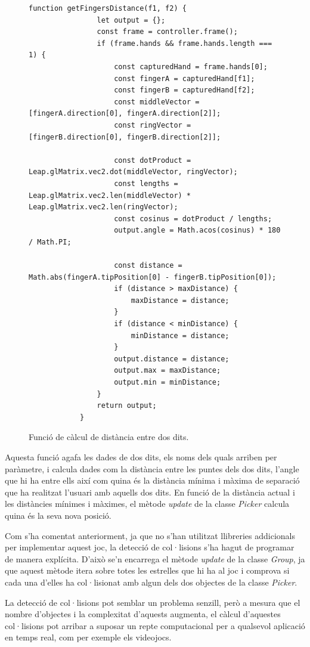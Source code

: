 \documentclass[12pt,a4paper,catalan]{article}
\begin{document}
	\begin{figure}[H]
		\begin{lstlisting}[gobble=12, tabsize=4]
			function getFingersDistance(f1, f2) {
				let output = {};
				const frame = controller.frame();
				if (frame.hands && frame.hands.length === 1) {
					const capturedHand = frame.hands[0];
					const fingerA = capturedHand[f1];
					const fingerB = capturedHand[f2];
					const middleVector = [fingerA.direction[0], fingerA.direction[2]];
					const ringVector = [fingerB.direction[0], fingerB.direction[2]];
					
					const dotProduct = Leap.glMatrix.vec2.dot(middleVector, ringVector);
					const lengths = Leap.glMatrix.vec2.len(middleVector) * Leap.glMatrix.vec2.len(ringVector);
					const cosinus = dotProduct / lengths;
					output.angle = Math.acos(cosinus) * 180 / Math.PI;
					
					const distance = Math.abs(fingerA.tipPosition[0] - fingerB.tipPosition[0]);
					if (distance > maxDistance) {
						maxDistance = distance;
					}
					if (distance < minDistance) {
						minDistance = distance;
					}
					output.distance = distance;
					output.max = maxDistance;
					output.min = minDistance;
				}
				return output;
			}
		\end{lstlisting}
		\caption{Funció de càlcul de distància entre dos dits.}
		\label{fig:catch-stars-leap-controls}
	\end{figure}
	Aquesta funció agafa les dades de dos dits, els noms dels quals arriben per paràmetre, i calcula dades com la distància entre les puntes dels dos dits, l'angle que hi ha entre ells així com quina és la distància mínima i màxima de separació que ha realitzat l'usuari amb aquells dos dits.
	En funció de la distància actual i les distàncies mínimes i màximes, el mètode \textit{update} de la classe \textit{Picker} calcula quina és la seva nova posició.
	
	Com s'ha comentat anteriorment, ja que no s'han utilitzat llibreries addicionals per implementar aquest joc, la detecció de col·lisions s'ha hagut de programar de manera explícita. D'això se'n encarrega el mètode \textit{update} de la classe \textit{Group}, ja que aquest mètode itera sobre totes les estrelles que hi ha al joc i comprova si cada una d'elles ha col·lisionat amb algun dels dos objectes de la classe \textit{Picker}.
	
	La detecció de col·lisions pot semblar un problema senzill, però a mesura que el nombre d'objectes i la complexitat d'aquests augmenta, el càlcul d'aquestes col·lisions pot arribar a suposar un repte computacional per a qualsevol aplicació en temps real, com per exemple els videojocs.
	
\end{document}
